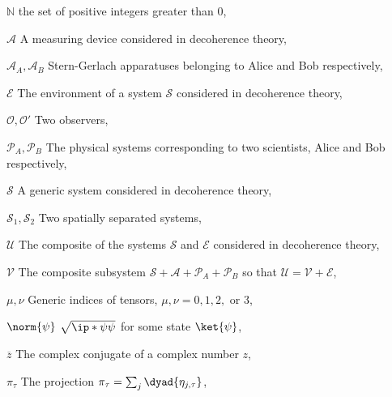 \begin{thenomenclature}
      \item [{$\mathbb{N}$}]\begingroup  the set of positive integers greater than $0$, \nomrefpage{}
      \item [{$\mathcal{A}$}]\begingroup A measuring device considered in decoherence theory, \nomrefpage{}
      \item [{$\mathcal{A}_A, \mathcal{A}_B$}]\begingroup Stern-Gerlach apparatuses belonging to Alice and Bob respectively,  \nomrefpage{}
      \item [{$\mathcal{E}$}]\begingroup The environment of a system $\mathcal{S}$ considered in decoherence theory, \nomrefpage{}
      \item [{$\mathcal{O}, \mathcal{O}'$}]\begingroup Two observers, \nomrefpage{}
      \item [{$\mathcal{P}_A,\mathcal{P}_B$}]\begingroup The physical systems corresponding to two scientists, Alice and Bob respectively, \nomrefpage{}
      \item [{$\mathcal{S}$}]\begingroup A generic system considered in decoherence theory, \nomrefpage{}
      \item [{$\mathcal{S}_1, \mathcal{S}_2$}]\begingroup Two spatially separated systems, \nomrefpage{}
      \item [{$\mathcal{U}$}]\begingroup The composite of the systems $\mathcal{S}$ and $\mathcal{E}$ considered in decoherence theory, \nomrefpage{}
      \item [{$\mathcal{V}$}]\begingroup The composite subsystem $\mathcal{S}+\mathcal{A}+\mathcal{P}_A+\mathcal{P}_B$ so that $\mathcal{U}=\mathcal{V}+\mathcal{E}$, \nomrefpage{}
      \item [{$\mu, \nu$}]\begingroup Generic indices of tensors, $\mu, \nu=0,1,2,$ or $3$, \nomrefpage{}
      \item [{$\norm{\psi}$}]\begingroup $\sqrt{\ip*{\psi}{\psi}}$ for some state $\ket{\psi}$, \nomrefpage{}
      \item [{$\overline {z}$}]\begingroup The complex conjugate of a complex number $z$, \nomrefpage {}
      \item [{$\pi_\tau$}]\begingroup The projection $\pi_\tau=\sum_j\dyad{\eta_{j,\tau}}$, \nomrefpage{}

\end{thenomenclature}
